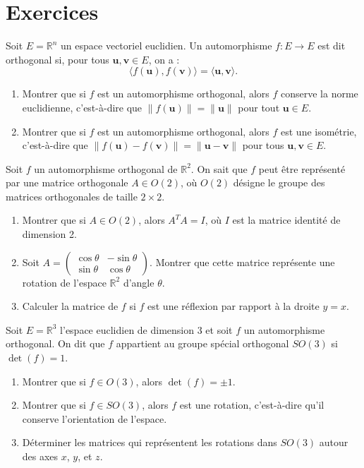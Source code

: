 \section{Exercices}
\begin{exercice}
Soit \( E = \mathbb{R}^n \) un espace vectoriel euclidien. Un automorphisme \( f : E \to E \) est dit orthogonal si, pour tous \( \mathbf{u}, \mathbf{v} \in E \), on a :
\[
\langle f(\mathbf{u}), f(\mathbf{v}) \rangle = \langle \mathbf{u}, \mathbf{v} \rangle.
\]
\begin{enumerate}
    \item Montrer que si \( f \) est un automorphisme orthogonal, alors \( f \) conserve la norme euclidienne, c'est-à-dire que \( \| f(\mathbf{u}) \| = \| \mathbf{u} \| \) pour tout \( \mathbf{u} \in E \).
    \item Montrer que si \( f \) est un automorphisme orthogonal, alors \( f \) est une isométrie, c'est-à-dire que \( \| f(\mathbf{u}) - f(\mathbf{v}) \| = \| \mathbf{u} - \mathbf{v} \| \) pour tous \( \mathbf{u}, \mathbf{v} \in E \).
\end{enumerate}
\end{exercice}

\begin{exercice}
Soit \( f \) un automorphisme orthogonal de \( \mathbb{R}^2 \). On sait que \( f \) peut être représenté par une matrice orthogonale \( A \in O(2) \), où \( O(2) \) désigne le groupe des matrices orthogonales de taille \( 2 \times 2 \).
\begin{enumerate}
    \item Montrer que si \( A \in O(2) \), alors \( A^T A = I \), où \( I \) est la matrice identité de dimension 2.
    \item Soit \( A = \begin{pmatrix} \cos \theta & -\sin \theta \\ \sin \theta & \cos \theta \end{pmatrix} \). Montrer que cette matrice représente une rotation de l'espace \( \mathbb{R}^2 \) d'angle \( \theta \).
    \item Calculer la matrice de \( f \) si \( f \) est une réflexion par rapport à la droite \( y = x \).
\end{enumerate}
\end{exercice}

\begin{exercice}
Soit \( E = \mathbb{R}^3 \) l'espace euclidien de dimension 3 et soit \( f \) un automorphisme orthogonal. On dit que \( f \) appartient au groupe spécial orthogonal \( SO(3) \) si \( \det(f) = 1 \).
\begin{enumerate}
    \item Montrer que si \( f \in O(3) \), alors \( \det(f) = \pm 1 \).
    \item Montrer que si \( f \in SO(3) \), alors \( f \) est une rotation, c'est-à-dire qu'il conserve l'orientation de l'espace.
    \item Déterminer les matrices qui représentent les rotations dans \( SO(3) \) autour des axes \( x \), \( y \), et \( z \).
\end{enumerate}
\end{exercice}

